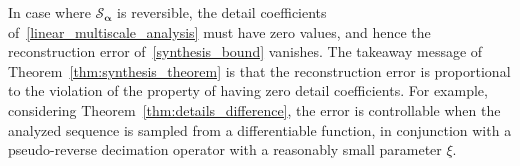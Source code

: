 \documentclass[12pt]{article}
\begin{document}
In case where $\mathcal{S}_{\boldsymbol{\alpha}}$ is reversible, the detail coefficients of~\eqref{linear_multiscale_analysis} must have zero values, and hence the reconstruction error of~\eqref{synthesis_bound} vanishes. The takeaway message of Theorem~\ref{thm:synthesis_theorem} is that the reconstruction error is proportional to the violation of the property of having zero detail coefficients. For example, considering Theorem~\ref{thm:details_difference}, the error is controllable when the analyzed sequence is sampled from a differentiable function, in conjunction with a pseudo-reverse decimation operator with a reasonably small parameter $\xi$.

\end{document}
